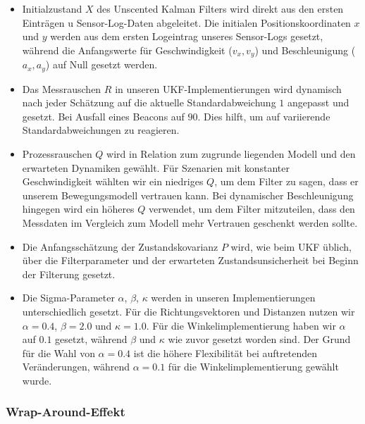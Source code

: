 \documentclass[conference]{IEEEtran}[10pt]
\begin{document}
\begin{itemize}

    \item Initialzustand \(X\) des Unscented Kalman Filters wird direkt aus den ersten Einträgen u Sensor-Log-Daten abgeleitet. Die initialen Positionskoordinaten \(x\) und \(y\) werden aus dem ersten Logeintrag unseres Sensor-Logs gesetzt, während die Anfangswerte für Geschwindigkeit (\(v_x, v_y\)) und Beschleunigung (\(a_x, a_y\)) auf Null gesetzt werden.

    \item Das Messrauschen \(R\) in unseren UKF-Implementierungen wird dynamisch nach jeder Schätzung auf die aktuelle Standardabweichung \(1\) angepasst und gesetzt. Bei Ausfall eines Beacons auf \(90\). Dies hilft, um auf variierende Standardabweichungen zu reagieren.

    \item Prozessrauschen \(Q\) wird in Relation zum zugrunde liegenden Modell und den erwarteten Dynamiken gewählt. Für Szenarien mit konstanter Geschwindigkeit wählten wir ein niedriges \(Q\), um dem Filter zu sagen, dass er unserem Bewegungsmodell vertrauen kann. Bei dynamischer Beschleunigung hingegen wird ein höheres \(Q\) verwendet, um dem Filter mitzuteilen, dass den Messdaten im Vergleich zum Modell mehr Vertrauen geschenkt werden sollte. 

    \item Die Anfangsschätzung der Zustandskovarianz \(P\) wird, wie beim UKF üblich, über die Filterparameter und der erwarteten Zustandsunsicherheit bei Beginn der Filterung gesetzt. 

    \item Die Sigma-Parameter \(\alpha\), \(\beta\), \(\kappa\) werden in unseren Implementierungen unterschiedlich gesetzt. Für die Richtungsvektoren und Distanzen nutzen wir \(\alpha = 0.4\), \(\beta = 2.0\) und \(\kappa = 1.0\). Für die Winkelimplementierung haben wir \(\alpha\) auf \(0.1\) gesetzt, während \(\beta\) und \(\kappa\) wie zuvor gesetzt worden sind. Der Grund für die Wahl von \(\alpha = 0.4\) ist die höhere Flexibilität bei auftretenden Veränderungen, während \(\alpha = 0.1\) für die Winkelimplementierung gewählt wurde.

\end{itemize}




\subsubsection{Wrap-Around-Effekt}
\end{document}
